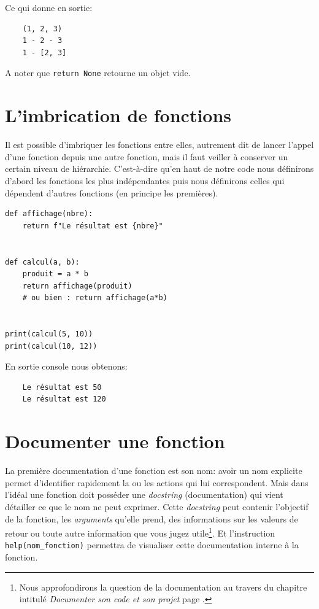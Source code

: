 \documentclass[a4paper,11pt]{book}
\begin{document}
Ce qui donne en sortie:
\begin{verbatim}
    (1, 2, 3)
    1 - 2 - 3
    1 - [2, 3]
\end{verbatim}
\medskip

A noter que \texttt{return None} retourne un objet vide.
\medskip

\section{L'imbrication de fonctions}
Il est possible d'imbriquer les fonctions entre elles, autrement dit de lancer l'appel d'une fonction depuis une autre fonction, mais il faut veiller à conserver un certain niveau de hiérarchie. C'est-à-dire qu'en haut de notre code nous définirons d'abord les fonctions les plus indépendantes puis nous définirons celles qui dépendent d'autres fonctions (en principe les premières).
\begin{lstlisting}[caption=Exemple de fonctions imbriquées]
def affichage(nbre):
    return f"Le résultat est {nbre}"


def calcul(a, b):
    produit = a * b
    return affichage(produit)
    # ou bien : return affichage(a*b)


print(calcul(5, 10))
print(calcul(10, 12))
\end{lstlisting}
\medskip

En sortie console nous obtenons:
\begin{verbatim}
    Le résultat est 50
    Le résultat est 120
\end{verbatim}
\medskip

\section{Documenter une fonction}
La première documentation d'une fonction est son nom: avoir un nom explicite permet d'identifier rapidement la ou les actions qui lui correspondent. Mais dans l'idéal une fonction doit posséder une \textit{docstring} (documentation) qui vient détailler ce que le nom ne peut exprimer. Cette \textit{docstring} peut contenir l'objectif de la fonction, les \textit{arguments} qu'elle prend, des informations sur les valeurs de retour ou toute autre information que vous jugez utile\footnote{Nous approfondirons la question de la documentation au travers du chapitre intitulé \textit{Documenter son code et son projet} page \pageref{documentercodeprojet}.}. Et l'instruction \texttt{help(nom\_fonction)} permettra de visualiser cette documentation interne à la fonction. 
\medskip
\end{document}
